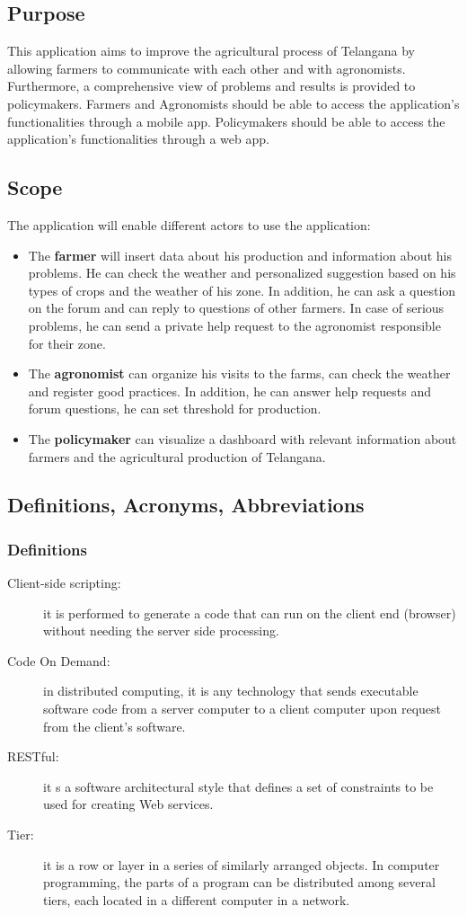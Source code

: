 \subsection{Purpose}
This application aims to improve the agricultural process of Telangana by allowing farmers to communicate with each other and with agronomists.
Furthermore, a comprehensive view of problems and results is provided to policymakers.
Farmers and  Agronomists should be able to access the application's functionalities through a mobile app. Policymakers should be able to access the application's functionalities through a web app.
\subsection{Scope}
The application will enable different actors to use the application:

\begin{itemize}
    \item The \textbf{farmer} will insert data about his production and information about his problems. He can check the weather and personalized suggestion based on his types of crops and the weather of his zone. In addition, he can ask a question on the forum and can reply to questions of other farmers. In case of serious problems, he can send a private help request to the agronomist responsible for their zone.
    \item The \textbf{agronomist} can organize his visits to the farms, can check the weather and register good practices. In addition, he can answer help requests and forum questions, he can set threshold for production.
    \item The \textbf{policymaker} can visualize a dashboard with relevant information about farmers and the agricultural production of Telangana.
\end{itemize}

\subsection{Definitions, Acronyms, Abbreviations}
\subsubsection{Definitions}
\begin{description}
    \item [Client-side scripting:] it is performed to generate a code that can run on the client end (browser) without needing the server side processing.
    \item [Code On Demand:] in distributed computing, it is any technology that sends executable software code from a server computer to a client computer upon request from the client's software.
    \item [RESTful:] it s a software architectural style that defines a set of constraints to be used for creating Web services.
    \item [Tier:] it is a row or layer in a series of similarly arranged objects. In computer programming, the parts of a program can be distributed among several tiers, each located in a different computer in a network.
\end{description}

